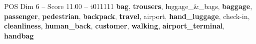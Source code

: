 \begin{textsample}{POS Dim 6 – Score 11.00 – t011111}  \label{ex:f6_pos_038}
\textbf{bag}, \textbf{trousers}, luggage\_\&\_bags, \textbf{baggage}, \textbf{passenger}, \textbf{pedestrian}, \textbf{backpack}, \textbf{travel}, airport, \textbf{hand\_luggage}, check-in, \textbf{cleanliness}, \textbf{human\_back}, \textbf{customer}, \textbf{walking}, \textbf{airport\_terminal}, \textbf{handbag}

\end{textsample}
